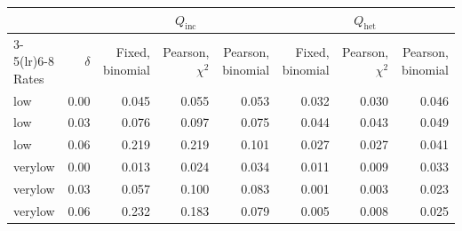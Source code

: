 \begin{tabular}{lrrrrrrr}
\toprule
 & & \multicolumn{3}{c}{$Q_{\mathrm{inc}}$} & \multicolumn{3}{c}{$Q_{\mathrm{het}}$} \\
\cmidrule(lr){3-5}\cmidrule(lr){6-8}
Rates & $\delta$ & Fixed, binomial & Pearson, $\chi^2$ & Pearson, binomial & Fixed, binomial & Pearson, $\chi^2$ & Pearson, binomial \\
\midrule
low & 0.00 & 0.045 & 0.055 & 0.053 & 0.032 & 0.030 & 0.046 \\
low & 0.03 & 0.076 & 0.097 & 0.075 & 0.044 & 0.043 & 0.049 \\
low & 0.06 & 0.219 & 0.219 & 0.101 & 0.027 & 0.027 & 0.041 \\
verylow & 0.00 & 0.013 & 0.024 & 0.034 & 0.011 & 0.009 & 0.033 \\
verylow & 0.03 & 0.057 & 0.100 & 0.083 & 0.001 & 0.003 & 0.023 \\
verylow & 0.06 & 0.232 & 0.183 & 0.079 & 0.005 & 0.008 & 0.025 \\
\bottomrule
\end{tabular}

